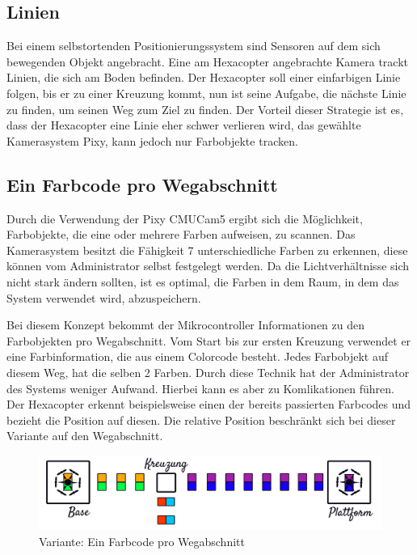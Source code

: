   \subsection*{Linien}
  Bei einem selbstortenden Positionierungssystem sind Sensoren auf dem sich bewegenden Objekt angebracht.
  Eine am Hexacopter angebrachte Kamera trackt Linien, die sich am Boden befinden. Der Hexacopter soll einer einfarbigen Linie folgen, bis er zu einer Kreuzung kommt, nun ist seine Aufgabe, die nächste Linie zu finden, um seinen Weg zum Ziel zu finden. Der Vorteil dieser Strategie ist es, dass der Hexacopter eine Linie eher schwer verlieren wird, das gewählte Kamerasystem Pixy, kann jedoch nur Farbobjekte tracken.

  \subsection*{Ein Farbcode pro Wegabschnitt}
  Durch die Verwendung der Pixy CMUCam5 ergibt sich die Möglichkeit, Farbobjekte, die eine oder mehrere Farben aufweisen, zu scannen.
  Das Kamerasystem besitzt die Fähigkeit 7 unterschiedliche Farben zu erkennen, diese können vom Administrator selbst festgelegt werden. Da die Lichtverhältnisse sich nicht stark ändern sollten, ist es optimal, die Farben in dem Raum, in dem das System verwendet wird, abzuspeichern.

  Bei diesem Konzept bekommt der Mikrocontroller Informationen zu den Farbobjekten pro Wegabschnitt. Vom Start bis zur ersten Kreuzung verwendet er eine Farbinformation, die aus einem Colorcode besteht. Jedes Farbobjekt auf diesem Weg, hat die selben 2 Farben. Durch diese Technik hat der Administrator des Systems weniger Aufwand. Hierbei kann es aber zu Komlikationen führen. Der Hexacopter erkennt beispielsweise einen der bereits passierten Farbcodes und bezieht die Position auf diesen. Die relative Position beschränkt sich bei dieser Variante auf den Wegabschnitt.

    \begin{figure}[H]
      \begin{centering}
        \includegraphics[width = \textwidth]{Bilder/bor_var1}
      \par\end{centering}
      \caption{Variante: Ein Farbcode pro Wegabschnitt}
      \label{Variante1}
    \end{figure}

